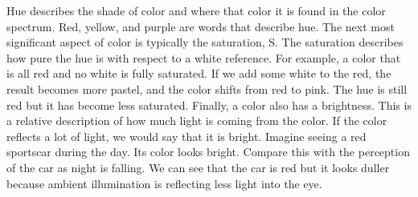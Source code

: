 \documentclass[
	article,			%
	11pt,				%
	oneside,			%
	a4paper,			%
	english,			%
	brazil,				%
	sumario=tradicional
	]{abntex2}
\begin{document}
Hue describes the shade of color and where that color it is found in the color
spectrum. Red, yellow, and purple are words that describe hue.
The next most significant aspect of color is typically the saturation,   S. The
saturation describes how pure the hue is with respect to a white reference. For
example, a color that is all red and no white is fully saturated. If we add some
white to the red, the result becomes more pastel, and the color shifts from red
to pink. The hue is still red but it has become less saturated.
Finally, a color also has a brightness.   This is a relative description of how
much light is coming from the color. If the color reflects a lot of light, we
would say that it is bright. Imagine seeing a red sportscar during the day. Its
color looks bright. Compare this with the perception of the car as night is
falling. We can see that the car is red but it looks duller because ambient  
illumination is reflecting less light into the eye.
\end{document}
